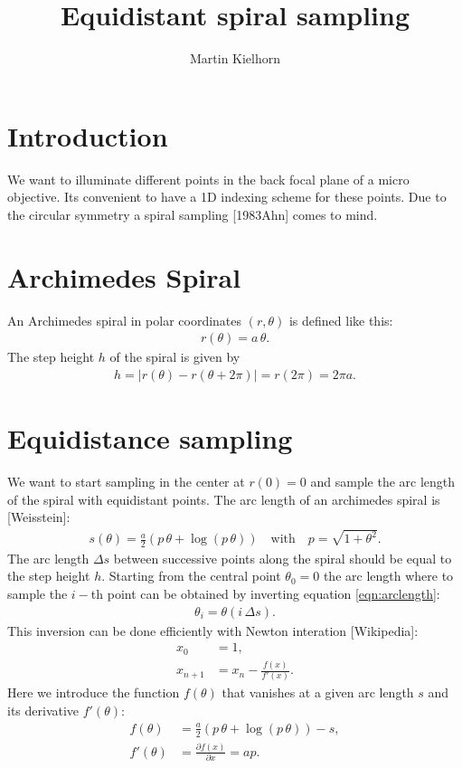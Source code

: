 \documentclass[twocolumn,DIV18]{scrartcl}
\newcommand{\abs}[1]{\lvert #1 \rvert}
\renewcommand{\(}{\left(}
\renewcommand{\)}{\right)}
\begin{document}
\title{Equidistant spiral sampling}
\author{Martin Kielhorn}
\maketitle
\section{Introduction}
We want to illuminate different points in the back focal plane of a
micro objective. Its convenient to have a 1D indexing scheme for these
points. Due to the circular symmetry a spiral sampling [1983Ahn] comes
to mind. 

\section{Archimedes Spiral}
An Archimedes spiral in polar coordinates $(r,\theta)$ is defined like
this:
\begin{align}
  r(\theta)=a\,\theta.
\end{align}
The step height $h$ of the spiral is given by
\begin{align}
  h=\abs{r(\theta)-r(\theta+2\pi)}=r(2\pi)=2\pi a.
\end{align}
\section{Equidistance sampling}
We want to start sampling in the center at $r(0)=0$ and sample the arc
length of the spiral with equidistant points. The arc length of an
archimedes spiral is [Weisstein]:
\begin{align} \label{eqn:arclength}
  s(\theta)=\frac{a}{2}\(p\,\theta + \log(p\,\theta)\)\quad\textrm{with}\quad
  p=\sqrt{1+\theta^2}.
\end{align}
The arc length $\Delta s$ between successive points along the spiral
should be equal to the step height $h$. Starting from the central
point $\theta_0=0$ the arc length where to sample the $i-$th point can
be obtained by inverting equation \eqref{eqn:arclength}:
\begin{align}
  \theta_i=\theta(i\,\Delta s).
\end{align}
This inversion can be done efficiently with Newton interation
[Wikipedia]:
\begin{align}
  x_0&=1,\\
  x_{n+1}&=x_n-\frac{f(x)}{f'(x)}.
\end{align}
Here we introduce the function $f(\theta)$ that vanishes at a given arc
length $s$ and its derivative $f'(\theta)$:
\begin{align}
  \label{eqn:f}
  f(\theta)&=\frac{a}{2}\(p\,\theta+\log(p\,\theta)\)-s,\\
  f'(\theta)&=\frac{\partial f(x)}{\partial x}=a p.
\end{align}
\end{document}
